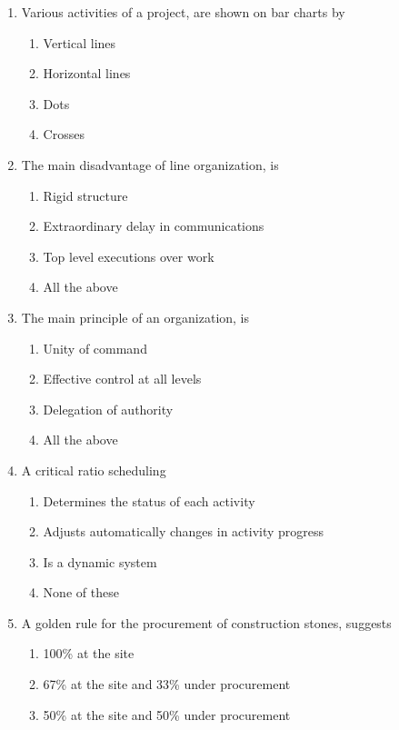 \documentclass[11pt,a4paper]{article}
\begin{document}
\begin{enumerate}
\item{Various activities of a project, are shown on bar charts by}
\begin{enumerate}[label=\Alph*.]
\item{Vertical lines}
\item{Horizontal lines}
\item{Dots}
\item{Crosses}
\end{enumerate}
\item{The main disadvantage of line organization, is}
\begin{enumerate}[label=\Alph*.]
\item{Rigid structure}
\item{Extraordinary delay in communications}
\item{Top level executions over work}
\item{All the above}
\end{enumerate}
\item{The main principle of an organization, is}
\begin{enumerate}[label=\Alph*.]
\item{Unity of command}
\item{Effective control at all levels}
\item{Delegation of authority}
\item{All the above}
\end{enumerate}
\item{A critical ratio scheduling}
\begin{enumerate}[label=\Alph*.]
\item{Determines the status of each activity}
\item{Adjusts automatically changes in activity progress}
\item{Is a dynamic system}
\item{None of these}
\end{enumerate}
\item{A golden rule for the procurement of construction stones, suggests}
\begin{enumerate}[label=\Alph*.]
\item{100\% at the site}
\item{67\% at the site and 33\% under procurement}
\item{50\% at the site and 50\% under procurement}

\end{enumerate}
\end{enumerate}
\end{document}

